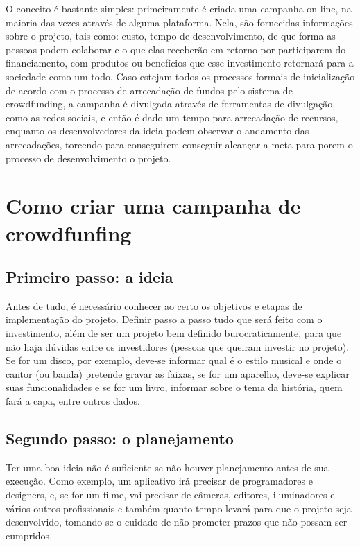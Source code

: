 \documentclass{classe_cn}                 %
\begin{document}
O conceito é bastante simples: primeiramente é criada uma campanha on-line, na maioria das vezes através de alguma plataforma. Nela, são fornecidas informações sobre o projeto, tais como: custo, tempo de desenvolvimento, de que forma as pessoas podem colaborar e o que elas receberão em retorno por participarem do financiamento, com produtos ou benefícios que esse investimento retornará para a sociedade como um todo. Caso estejam todos os processos formais de inicialização de acordo com o processo de arrecadação de fundos pelo sistema de crowdfunding, a campanha é divulgada através de ferramentas de divulgação, como as redes sociais, e então é dado um tempo para arrecadação de recursos, enquanto os desenvolvedores da ideia podem observar o andamento das arrecadações, torcendo para conseguirem conseguir alcançar a meta para porem o processo de desenvolvimento o projeto.

\section{Como criar uma campanha de crowdfunfing}

\subsection{Primeiro passo: a ideia}

Antes de tudo, é necessário conhecer ao certo os objetivos e etapas de implementação do projeto. Definir passo a passo tudo que será feito com o investimento, além de ser um projeto bem definido burocraticamente, para que não haja dúvidas entre os investidores (pessoas que queiram investir no projeto). Se for um disco, por exemplo, deve-se informar qual é o estilo musical e onde o cantor (ou banda) pretende gravar as faixas, se for um aparelho, deve-se explicar suas funcionalidades e se for um livro, informar sobre o tema da história, quem fará a capa, entre outros dados.

\subsection{Segundo passo: o planejamento}

Ter uma boa ideia não é suficiente se não houver planejamento antes de sua execução. Como exemplo, um aplicativo irá precisar de programadores e designers, e, se for um filme, vai precisar de câmeras, editores, iluminadores e vários outros profissionais e também quanto tempo levará para que o projeto seja desenvolvido, tomando-se o cuidado de não prometer prazos que não possam ser cumpridos.
\end{document}
